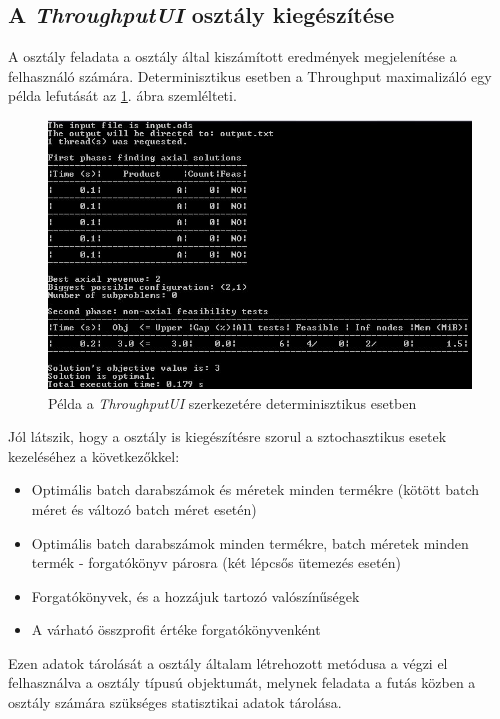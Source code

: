 \subsection{A \textit{ThroughputUI} osztály kiegészítése}
A  osztály feladata a  osztály által kiszámított eredmények megjelenítése a felhasználó számára.
Determinisztikus esetben a Throughput maximalizáló egy példa lefutását az \ref{ThroughputUI}. ábra szemlélteti.
\begin{figure}[H]
\begin{center}
\includegraphics[scale=0.62]{throughputUI}
\caption{Példa a \textit{ThroughputUI} szerkezetére determinisztikus esetben}
\label{ThroughputUI}
\end{center}
\end{figure}
Jól látszik, hogy a  osztály is kiegészítésre szorul a sztochasztikus esetek kezeléséhez a következőkkel:
\begin{itemize}
\item Optimális batch darabszámok és méretek minden termékre (kötött batch méret és változó batch méret esetén)
\item Optimális batch darabszámok minden termékre, batch méretek minden termék - forgatókönyv párosra (két lépcsős ütemezés esetén)
\item Forgatókönyvek, és a hozzájuk tartozó valószínűségek
\item A várható összprofit értéke forgatókönyvenként
\end{itemize}
Ezen adatok tárolását a  osztály általam létrehozott metódusa a  végzi el felhasználva a  osztály  típusú objektumát, melynek feladata a futás közben a  osztály számára szükséges statisztikai adatok tárolása.
